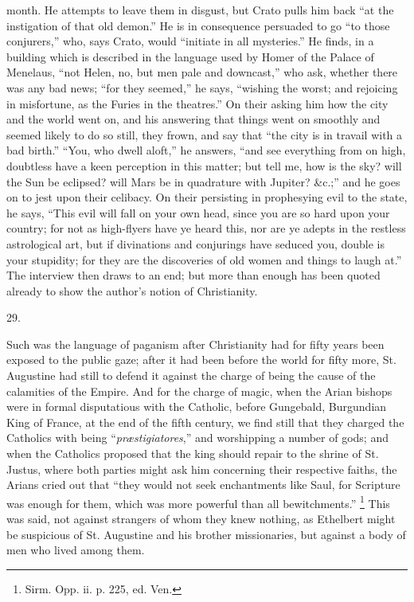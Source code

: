month. He attempts to leave them in disgust, but Crato
pulls him back ``at the instigation of that old
demon.'' He is in consequence persuaded to go
``to those conjurers,'' who, says Crato, would
``initiate in all mysteries.'' He finds, in a
building which is described in the language used by Homer
of the Palace of Menelaus, ``not Helen, no, but men
pale and downcast,'' who ask, whether there was any
bad news; ``for they seemed,'' he says,
``wishing the worst; and rejoicing in misfortune, as
the Furies in the theatres.'' On their asking him how
the city and the world went on, and his answering that
things went on smoothly and seemed likely to do so still,
they frown, and say that ``the city is in travail
with a bad birth.'' ``You, who dwell aloft,''
he answers, ``and see everything from on high,
doubtless have a keen perception in this matter; but tell
me, how is the sky? will the Sun be eclipsed? will Mars
be in quadrature with Jupiter? \&c.;'' and he goes
on to jest upon their celibacy. On their persisting in
prophesying evil to the state, he says, ``This evil
will fall on your own head, since you are so hard upon
your country; for not as high-flyers have ye heard this,
nor are ye adepts in the restless astrological art, but
if divinations and conjurings have seduced you, double is
your stupidity; for they are the discoveries of old women
and things to laugh at.'' The interview then draws to
an end; but more than enough has been quoted already to
show the author's notion of Christianity.

29.

Such was the language of paganism after Christianity
had for fifty years been exposed to the public gaze;
after it had been before the world for fifty more, St.
Augustine had still to defend it against the charge of
being the cause of the calamities of the Empire. And for
the charge of magic, when the Arian bishops were in
formal disputatious with the Catholic, before Gungebald,
Burgundian King of France, at the end of the fifth
century, we find still that they charged the Catholics
with being ``\emph{præstigiatores},'' and
worshipping a number of gods; and when the Catholics
proposed that the king should repair to the shrine of St.
Justus, where both parties might ask him concerning their
respective faiths, the Arians cried out that ``they
would not seek enchantments like Saul, for Scripture was
enough for them, which was more powerful than all
bewitchments.'' \footnote{Sirm. Opp. ii. p. 225, ed.
Ven.} This was said, not against
strangers of whom they knew nothing, as Ethelbert might
be suspicious of St. Augustine and his brother
missionaries, but against a body of men who lived among
them.

